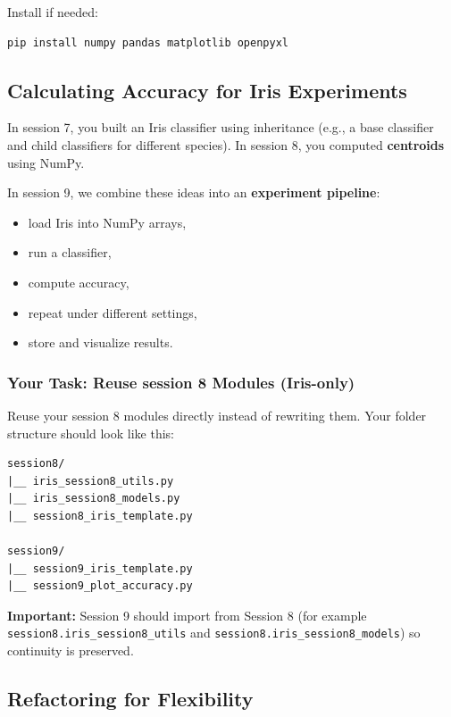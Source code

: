 \noindent
Install if needed:
\begin{verbatim}
pip install numpy pandas matplotlib openpyxl
\end{verbatim}

\newpage
\subsection{Calculating Accuracy for Iris Experiments}

In session 7, you built an Iris classifier using inheritance (e.g., a base classifier and child classifiers for different species).
In session 8, you computed \textbf{centroids} using NumPy.

\noindent
In session 9, we combine these ideas into an \textbf{experiment pipeline}:
\begin{itemize}\setlength{\itemsep}{0pt}
\item load Iris into NumPy arrays,
\item run a classifier,
\item compute accuracy,
\item repeat under different settings,
\item store and visualize results.
\end{itemize}

\subsubsection{Your Task: Reuse session 8 Modules (Iris-only)}

Reuse your session 8 modules directly instead of rewriting them.
Your folder structure should look like this:

\begin{verbatim}
session8/
|__ iris_session8_utils.py
|__ iris_session8_models.py
|__ session8_iris_template.py

session9/
|__ session9_iris_template.py
|__ session9_plot_accuracy.py
\end{verbatim}

\noindent
\textbf{Important:} Session 9 should import from Session 8 (for example \texttt{session8.iris\_session8\_utils} and \texttt{session8.iris\_session8\_models}) so continuity is preserved.

\newpage
\subsection{Refactoring for Flexibility}
\label{sec:activity2}

